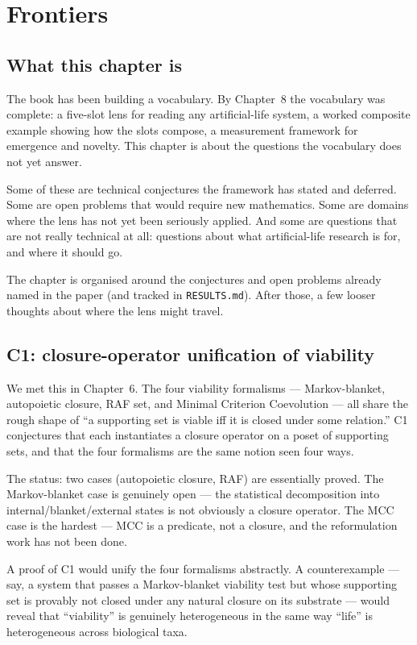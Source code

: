 \chapter{Frontiers}

\section{What this chapter is}

The book has been building a vocabulary. By Chapter~8 the vocabulary
was complete: a five-slot lens for reading any artificial-life system,
a worked composite example showing how the slots compose, a
measurement framework for emergence and novelty. This chapter is about
the questions the vocabulary does not yet answer.

Some of these are technical conjectures the framework has stated and
deferred. Some are open problems that would require new mathematics.
Some are domains where the lens has not yet been seriously applied.
And some are questions that are not really technical at all: questions
about what artificial-life research is for, and where it should go.

The chapter is organised around the conjectures and open problems
already named in the paper (and tracked in \texttt{RESULTS.md}). After
those, a few looser thoughts about where the lens might travel.

\section{C1: closure-operator unification of viability}

We met this in Chapter~6. The four viability formalisms ---
Markov-blanket, autopoietic closure, RAF set, and Minimal Criterion
Coevolution --- all share the rough shape of ``a supporting set is
viable iff it is closed under some relation.'' C1 conjectures that
each instantiates a closure operator on a poset of supporting sets,
and that the four formalisms are the same notion seen four ways.

The status: two cases (autopoietic closure, RAF) are essentially
proved. The Markov-blanket case is genuinely open --- the statistical
decomposition into internal/blanket/external states is not obviously
a closure operator. The MCC case is the hardest --- MCC is a
predicate, not a closure, and the reformulation work has not been
done.

A proof of C1 would unify the four formalisms abstractly. A
counterexample --- say, a system that passes a Markov-blanket
viability test but whose supporting set is provably not closed under
any natural closure on its substrate --- would reveal that
``viability'' is genuinely heterogeneous in the same way ``life'' is
heterogeneous across biological taxa.

